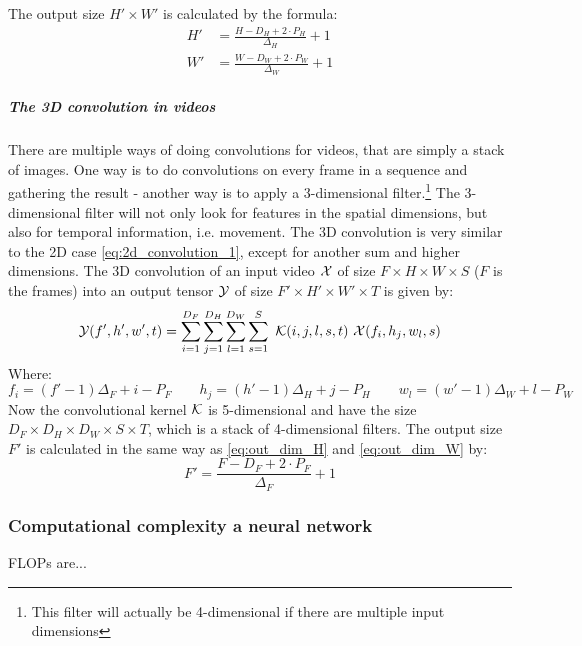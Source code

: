 The output size $H' \times W'$ is calculated by the formula:
\begin{align}
    H' &= \frac{H - D_H + 2\cdot P_H}{\Delta_H} + 1 \label{eq:out_dim_H}\\
    W' &= \frac{W - D_W + 2\cdot P_W}{\Delta_W} + 1 \label{eq:out_dim_W}
\end{align}
\subparagraph{The 3D convolution in videos}
There are multiple ways of doing convolutions for videos, that are simply a stack of images. One way is to do convolutions on every frame in a sequence and gathering the result - another way is to apply a 3-dimensional filter.\footnote{This filter will actually be 4-dimensional if there are multiple input dimensions} The 3-dimensional filter will not only look for features in the spatial dimensions, but also for temporal information, i.e. movement. The 3D convolution is very similar to the 2D case \eqref{eq:2d_convolution_1}, except for another sum and higher dimensions. The 3D convolution of an input video $\mathcal{X}$ of size $F\times H \times W \times S$ ($F$ is the frames) into an output tensor $\mathcal{Y}$ of size $F'\times H' \times W' \times T$ is given by:
\begin{equation}
    \tensor{Y}(f', h', w', t) = \sum_{i=1}^{D_F} \sum_{j=1}^{D_H} \sum_{l=1}^{D_W} \sum_{s=1}^{S} \ \tensor{K}(i, j, l, s, t) \ \tensor{X}(f_i, h_j, w_l, s)
\end{equation}
Where:
\begin{equation}
    f_i = \left(f' - 1\right) \Delta_F + i - P_F \qquad h_j =  \left(h' - 1\right) \Delta_H + j - P_H \qquad w_l =  \left(w' - 1\right) \Delta_W + l - P_W
\end{equation}
Now the convolutional kernel $\mathcal{K}$ is 5-dimensional and have the size $D_F \times D_H \times D_W \times S \times T$, which is a stack of 4-dimensional filters. The output size $F'$ is calculated in the same way as \eqref{eq:out_dim_H} and \eqref{eq:out_dim_W} by:
\begin{equation}
    F' = \frac{F - D_F + 2\cdot P_F}{\Delta_F} + 1
\end{equation}

\subsubsection{Computational complexity a neural network}
FLOPs are...



